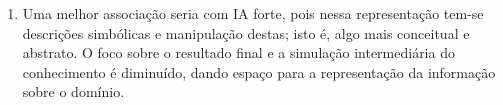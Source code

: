 \documentclass{article}
\begin{document}
\begin{enumerate}[label=\textbf{\arabic*})]
\begin{enumerate}
        \end{enumerate}

    \item Uma melhor associação seria com IA forte, pois nessa representação
        tem-se descrições simbólicas e manipulação destas; isto é, algo mais
        conceitual e abstrato. O foco sobre o resultado final e a simulação
        intermediária do conhecimento é diminuído, dando espaço para a
        representação da informação sobre o domínio.

\end{enumerate}



\end{document}
